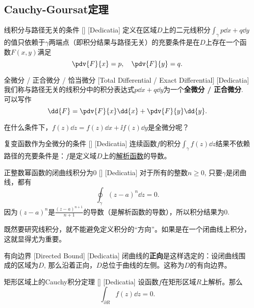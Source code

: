 \documentclass[UTF8]{ctexart}
\newcommand{\AnalyticalFunction}{\hyperref[dfn:AnalyticalFunction]{解析函数}}
\begin{document}
\subsection{Cauchy-Goursat定理}
\begin{thm}
    [UUID]
    {线积分与路径无关的条件}
    []
    [Dedicatia]
    定义在区域$D$上的二元线积分$\int_\gamma p\dd{x}+q\dd{y}$的值只依赖于$\gamma$两端点（即积分结果与路径无关）的充要条件是在$D$上存在一个函数$F(x,y)$满足
    \[\pdv{F}{x}=p,\quad\pdv{F}{y}=q.\]
\end{thm}
\begin{dfn}
    [ExactDifferential]
    {全微分 / 正合微分 / 恰当微分}
    [Total Differential / Exact Differential]
    [Dedicatia]
    我们称与路径无关的线积分中的积分表达式$p\dd{x}+q\dd{y}$为一个\textbf{全微分 / 正合微分}. 可以写作
    \[\dd{F}=\pdv{F}{x}\dd{x}+\pdv{F}{y}\dd{y}.\]
\end{dfn}
在什么条件下，$f(z)\dd{z}=f(z)\dd{x}+\ii f(z)\dd{y}$是全微分呢？
\begin{crl}
    [UUID]
    {复变函数作为全微分的条件}
    []
    [Dedicatia]
    连续函数$f$的积分$\int_\gamma f(z)\dd{z}$结果不依赖路径的充要条件是：$f$是定义域$D$上的\AnalyticalFunction 的导数。
\end{crl}
\begin{xmp}
    [UUID]
    {正整数幂函数的闭曲线积分为0}
    []
    [Dedicatia]
    对于所有的整数$n\geqslant 0$, 只要$\gamma$是闭曲线，都有
    \[\oint_\gamma (z-a)^n\dd{z}=0.\]
    因为$(z-a)^n$是$\frac{(z-a)^{n+1}}{n+1}$的导数（是解析函数的导数），所以积分结果为0. 
\end{xmp}
既然要研究线积分，就不能避免定义积分的“方向”。如果是在一个闭曲线上积分，这就显得尤为重要。
\begin{dfn}
    [UUID]
    {有向边界}
    [Directed Bound]
    [Dedicatia]
    闭曲线的\textbf{正向}是这样选定的：设闭曲线围成的区域为$D$, 那么沿着正向，$D$总位于曲线的左侧。这称为$D$的有向边界。
\end{dfn}
\begin{thm}
    [UUID]
    {矩形区域上的Cauchy积分定理}
    []
    [Dedicatia]
    设函数$f$在矩形区域$R$上解析。那么
    \[\int_{\partial R}f(z)\dd{z}=0.\]
\end{thm}
\end{document}
